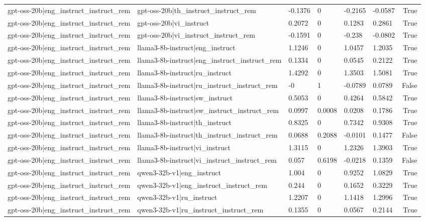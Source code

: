 \begin{table}
\begin{tabular}{llllllr}
gpt-oss-20b|eng_instruct_instruct_rem & gpt-oss-20b|th_instruct_instruct_rem & -0.1376 & 0 & -0.2165 & -0.0587 & True \\
gpt-oss-20b|eng_instruct_instruct_rem & gpt-oss-20b|vi_instruct & 0.2072 & 0 & 0.1283 & 0.2861 & True \\
gpt-oss-20b|eng_instruct_instruct_rem & gpt-oss-20b|vi_instruct_instruct_rem & -0.1591 & 0 & -0.238 & -0.0802 & True \\
gpt-oss-20b|eng_instruct_instruct_rem & llama3-8b-instruct|eng_instruct & 1.1246 & 0 & 1.0457 & 1.2035 & True \\
gpt-oss-20b|eng_instruct_instruct_rem & llama3-8b-instruct|eng_instruct_instruct_rem & 0.1334 & 0 & 0.0545 & 0.2122 & True \\
gpt-oss-20b|eng_instruct_instruct_rem & llama3-8b-instruct|ru_instruct & 1.4292 & 0 & 1.3503 & 1.5081 & True \\
gpt-oss-20b|eng_instruct_instruct_rem & llama3-8b-instruct|ru_instruct_instruct_rem & -0 & 1 & -0.0789 & 0.0789 & False \\
gpt-oss-20b|eng_instruct_instruct_rem & llama3-8b-instruct|sw_instruct & 0.5053 & 0 & 0.4264 & 0.5842 & True \\
gpt-oss-20b|eng_instruct_instruct_rem & llama3-8b-instruct|sw_instruct_instruct_rem & 0.0997 & 0.0008 & 0.0208 & 0.1786 & True \\
gpt-oss-20b|eng_instruct_instruct_rem & llama3-8b-instruct|th_instruct & 0.8325 & 0 & 0.7342 & 0.9308 & True \\
gpt-oss-20b|eng_instruct_instruct_rem & llama3-8b-instruct|th_instruct_instruct_rem & 0.0688 & 0.2088 & -0.0101 & 0.1477 & False \\
gpt-oss-20b|eng_instruct_instruct_rem & llama3-8b-instruct|vi_instruct & 1.3115 & 0 & 1.2326 & 1.3903 & True \\
gpt-oss-20b|eng_instruct_instruct_rem & llama3-8b-instruct|vi_instruct_instruct_rem & 0.057 & 0.6198 & -0.0218 & 0.1359 & False \\
gpt-oss-20b|eng_instruct_instruct_rem & qwen3-32b-v1|eng_instruct & 1.004 & 0 & 0.9252 & 1.0829 & True \\
gpt-oss-20b|eng_instruct_instruct_rem & qwen3-32b-v1|eng_instruct_instruct_rem & 0.244 & 0 & 0.1652 & 0.3229 & True \\
gpt-oss-20b|eng_instruct_instruct_rem & qwen3-32b-v1|ru_instruct & 1.2207 & 0 & 1.1418 & 1.2996 & True \\
gpt-oss-20b|eng_instruct_instruct_rem & qwen3-32b-v1|ru_instruct_instruct_rem & 0.1355 & 0 & 0.0567 & 0.2144 & True \\

\end{tabular}
\end{table}
